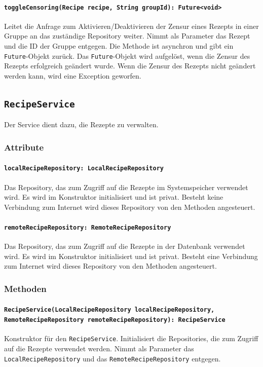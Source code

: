 \documentclass[parskip=full]{scrartcl}
\begin{document}
\paragraph{\texttt{toggleCensoring(Recipe recipe, String groupId): Future<void>}}
Leitet die Anfrage zum Aktivieren/Deaktivieren der Zensur eines Rezepts in einer Gruppe an das zuständige Repository weiter. Nimmt als Parameter das Rezept und die ID der Gruppe entgegen. Die Methode ist asynchron und gibt ein \texttt{Future}-Objekt zurück. Das \texttt{Future}-Objekt wird aufgelöst, wenn die Zensur des Rezepts erfolgreich geändert wurde. Wenn die Zensur des Rezepts nicht geändert werden kann, wird eine Exception geworfen.

\newpage
\subsection{\texttt{RecipeService}}
Der Service dient dazu, die Rezepte zu verwalten.
\subsubsection*{Attribute}
\paragraph{\texttt{localRecipeRepository: LocalRecipeRepository}}
Das Repository, das zum Zugriff auf die Rezepte im Systemspeicher verwendet wird. Es wird im Konstruktor initialisiert und ist privat. Besteht keine Verbindung zum Internet wird dieses Repository von den Methoden angesteuert.
\paragraph{\texttt{remoteRecipeRepository: RemoteRecipeRepository}}
Das Repository, das zum Zugriff auf die Rezepte in der Datenbank verwendet wird. Es wird im Konstruktor initialisiert und ist privat. Besteht eine Verbindung zum Internet wird dieses Repository von den Methoden angesteuert.
\subsubsection*{Methoden}
\paragraph{\texttt{RecipeService(LocalRecipeRepository localRecipeRepository, RemoteRecipeRepository remoteRecipeRepository): RecipeService}}
Konstruktor für den \texttt{RecipeService}. Initialisiert die Repositories, die zum Zugriff auf die Rezepte verwendet werden. Nimmt als Parameter das \texttt{LocalRecipeRepository} und das \texttt{RemoteRecipeRepository} entgegen.
\end{document}
